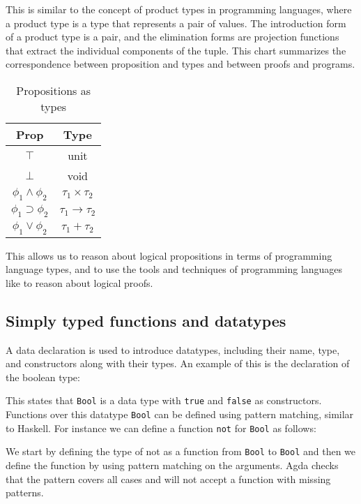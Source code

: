 \documentclass[titlepage]{article}
\begin{document}
This is similar to the concept of product types in programming languages, where a product type is a type that represents a pair of values. The introduction form of a product type is a pair, and the elimination forms are projection functions that extract the individual components of the tuple. This chart summarizes the correspondence between proposition and types and between proofs and programs.

\begin{table}[h!]
    \centering
    \begin{tabular}{c | c}
        Prop & Type \\
        \hline
        $\top$ & unit \\
        $\bot$ & void \\
        $\phi_1 \wedge \phi_2$ & $\tau_1 \times \tau_2$ \\
        $\phi_1 \supset \phi_2$ & $\tau_1 \to \tau_2$ \\
        $\phi_1 \vee \phi_2$ & $\tau_1 + \tau_2$
    \end{tabular}
    \caption{Propositions as types}
\end{table}

This allows us to reason about logical propositions in terms of programming language types, and to use the tools and techniques of programming languages like \Agda to reason about logical proofs.

\subsection{Simply typed functions and datatypes}
A data declaration is used to introduce datatypes, including their name, type, and constructors along with their types. An example of this is the declaration of the boolean type:


This states that \texttt{Bool} is a data type with \texttt{true} and \texttt{false} as constructors. Functions over this datatype \texttt{Bool} can be defined using pattern matching, similar to Haskell. For instance we can define a function \texttt{not} for \texttt{Bool} as follows:


We start by defining the type of not as a function from \texttt{Bool} to \texttt{Bool} and then we define the function by using pattern matching on the arguments. Agda checks that the pattern covers all cases and will not accept a function with missing patterns.
\end{document}

